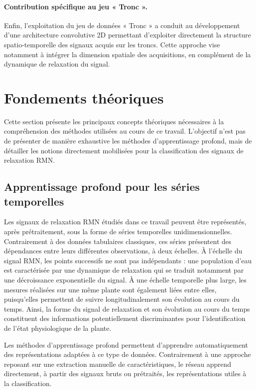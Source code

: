 \documentclass[12pt,a4paper,twoside]{article}
\begin{document}
\paragraph{Contribution spécifique au jeu « Tronc ».}
Enfin, l'exploitation du jeu de données « Tronc » a conduit au développement
d'une architecture convolutive 2D permettant d'exploiter directement la
structure spatio-temporelle des signaux acquis sur les troncs. Cette approche
vise notamment à intégrer la dimension spatiale des acquisitions, en complément
de la dynamique de relaxation du signal.

\section{Fondements théoriques}
\label{sec:fondements}

Cette section présente les principaux concepts théoriques nécessaires à la compréhension des méthodes utilisées au cours de ce travail. L'objectif n'est pas de présenter de manière exhaustive les méthodes d'apprentissage profond, mais de détailler les notions directement mobilisées pour la classification des signaux de relaxation RMN.

\subsection{Apprentissage profond pour les séries temporelles}
\label{subsec:deep_learning_series}

Les signaux de relaxation RMN étudiés dans ce travail peuvent être représentés, après prétraitement, sous la forme de séries temporelles unidimensionnelles. Contrairement à des données tabulaires classiques, ces séries présentent des dépendances entre leurs différentes observations, à deux échelles. À l'échelle du signal RMN, les points successifs ne sont pas indépendants : une population d'eau est caractérisée par une dynamique de relaxation qui se traduit notamment par une décroissance exponentielle du signal. À une échelle temporelle plus large, les mesures réalisées sur une même plante sont également liées entre elles, puisqu'elles permettent de suivre longitudinalement son évolution au cours du temps. Ainsi, la forme du signal de relaxation et son évolution au cours du temps constituent des informations potentiellement discriminantes pour l'identification de l'état physiologique de la plante.

Les méthodes d'apprentissage profond permettent d'apprendre automatiquement des représentations adaptées à ce type de données. Contrairement à une approche reposant sur une extraction manuelle de caractéristiques, le réseau apprend directement, à partir des signaux bruts ou prétraités, les représentations utiles à la classification.
\end{document}

